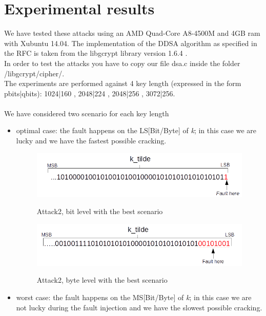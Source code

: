 \documentclass[11pt,english]{article}
\begin{document}
\section{Experimental results}
We have tested these attacks using an AMD Quad-Core A8-4500M and 4GB ram with Xubuntu 14.04. 
The implementation of the DDSA algorithm as specified in the RFC\cite{rfc} is taken from the libgcrypt library version 1.6.4 \cite{lib}.\\
In order to test the attacks you have to copy our file dsa.c inside the folder /libgcrypt/cipher/.
\\The experiments are performed against 4 key length (expressed in the form pbits|qbits): 1024|160 , 2048|224 , 2048|256 , 3072|256.\\\\
We have considered two scenario for each key length
\begin{itemize}
\item optimal case: the fault happens on the LS[Bit/Byte] of \textit{k}; in this case we are lucky and we have the fastest possible cracking.

\begin{figure}[H]
\includegraphics[width=1.0\textwidth]{img/bestcasebitfault.png} \\
\caption{\label{f_etichetta}Attack2, bit level with the best scenario }
\end{figure}

\begin{figure}[H]
\includegraphics[width=1.0\textwidth]{img/attack2bestbyte.png} \\
\caption{\label{f_etichetta}Attack2, byte level with the best scenario }
\end{figure}


\item worst case: the fault happens on the MS[Bit/Byte] of \textit{k}; in this case we are not lucky during the fault injection and we have the slowest possible cracking.
\end{itemize}
\end{document}
